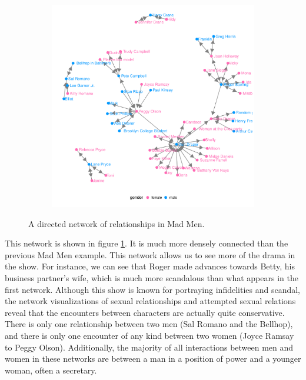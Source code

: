 \begin{figure}[hbtp]
\begin{subfigure}[t]{\textwidth}
\begin{adjustbox}{valign=t}
\begin{minipage}{.49\textwidth}
                   \end{minipage}

                  \begin{minipage}{.49\textwidth}

\includegraphics[width=\textwidth]{figure/madmen2_ggnetwork-1.pdf}

                          \end{minipage}

                          \end{adjustbox}
\end{subfigure}
\caption{\label{fig.cap:madmen2} A directed network of relationships in Mad Men.}
\end{figure}
\afterpage{\clearpage}

This network is shown in figure \ref{fig.cap:madmen2}.  It is much more densely connected than the previous Mad Men example.  This network allows us to see more of the drama in the show. For instance, we can see that Roger made advances towards Betty, his business partner's wife, which is much more scandalous than what appears in the first network. Although this show is known for portraying infidelities and scandal, the network visualizations of sexual relationships and attempted sexual relations reveal that the encounters between characters are actually quite conservative. There is only one relationship between two men (Sal Romano and the Bellhop), and there is only one encounter of any kind between two women (Joyce Ramsay to Peggy Olson). Additionally, the majority of all interactions between men and women in these networks are between a man in a position of power and a younger woman, often a secretary. 

